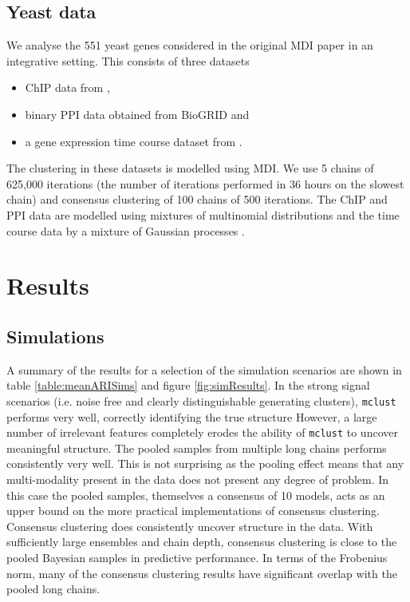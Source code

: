 \documentclass{bioinfo}
\begin{document}
\subsection{Yeast data}
We analyse the 551 yeast genes considered in the original MDI paper \citep{kirk2012bayesian} in an integrative setting. This consists of three datasets
\begin{itemize}
	\item  ChIP data from \cite{harbison2004transcriptional},
	\item binary PPI data obtained from BioGRID \citep{stark2006biogrid} and 
	\item a gene expression time course dataset from \cite{granovskaia2010high}.
\end{itemize}
The clustering in these datasets is modelled using MDI. We use 5 chains of 625,000 iterations (the number of iterations performed in 36 hours on the slowest chain) and consensus clustering of 100 chains of 500 iterations. The ChIP and PPI data are modelled using mixtures of multinomial distributions and the time course data by a mixture of Gaussian processes \citep[with dataset density choice following the original paper by ][]{kirk2012bayesian}.




\section{Results}
\subsection{Simulations}
A summary of the results for a selection of the simulation scenarios are shown in table \ref{table:meanARISims} and figure \ref{fig:simResults}. In the strong signal scenarios (i.e. noise free and clearly distinguishable generating clusters), \texttt{mclust} performs very well, correctly identifying the true structure However, a large number of irrelevant features completely erodes the ability of \texttt{mclust} to uncover meaningful structure. The pooled samples from multiple long chains performs consistently very well. This is not surprising as the pooling effect means that any multi-modality present in the data does not present any degree of problem. In this case the pooled samples, themselves a consensus of 10 models, acts as an upper bound on the more practical implementations of consensus clustering. Consensus clustering does consistently uncover structure in the data. With sufficiently large ensembles and chain depth, consensus clustering is close to the pooled Bayesian samples in predictive performance. In terms of the Frobenius norm, many of the consensus clustering results have significant overlap with the pooled long chains.
\end{document}
